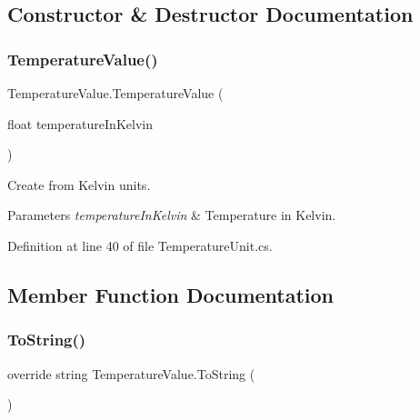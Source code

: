 \subsection{Constructor \& Destructor Documentation}
\mbox{\label{struct_temperature_value_a0c5d1613d2629789708449388230df00}} 
\subsubsection{\texorpdfstring{Temperature\+Value()}{TemperatureValue()}}
{\footnotesize\ttfamily Temperature\+Value.\+Temperature\+Value (\begin{DoxyParamCaption}\item[{float}]{temperature\+In\+Kelvin }\end{DoxyParamCaption})}



Create from Kelvin units. 


\begin{DoxyParams}{Parameters}
{\em temperature\+In\+Kelvin} & Temperature in Kelvin. \\
\hline
\end{DoxyParams}


Definition at line 40 of file Temperature\+Unit.\+cs.



\subsection{Member Function Documentation}
\mbox{\label{struct_temperature_value_afd6eeef5d9c43b759e6a6439ddc855aa}} 
\subsubsection{\texorpdfstring{To\+String()}{ToString()}\hspace{0.1cm}{\footnotesize\ttfamily [1/3]}}
{\footnotesize\ttfamily override string Temperature\+Value.\+To\+String (\begin{DoxyParamCaption}{ }\end{DoxyParamCaption})}



